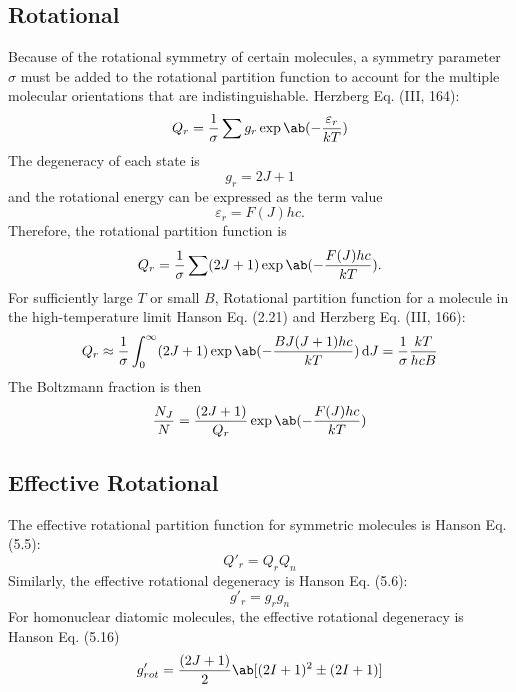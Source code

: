 \documentclass[11pt, twoside, fleqn]{report}
\begin{document}
\subsection{Rotational}
Because of the rotational symmetry of certain molecules, a symmetry parameter $\sigma$ must be added to the rotational partition function to account for the multiple molecular orientations that are indistinguishable.
Herzberg Eq. (III, 164):
\begin{equation*}
    Q_{r} = \frac{1}{\sigma} \sum g_{r}\exp\ab(-\frac{\varepsilon_{r}}{kT})
\end{equation*}
The degeneracy of each state is
\begin{equation*}
    g_{r} = 2J + 1
\end{equation*}
and the rotational energy can be expressed as the term value
\begin{equation*}
    \varepsilon_{r} = F(J)hc.
\end{equation*}
Therefore, the rotational partition function is
\begin{equation*}
    Q_{r} = \frac{1}{\sigma} \sum (2J + 1)\exp\ab(-\frac{F(J)hc}{kT}).
\end{equation*}
For sufficiently large $T$ or small $B$,
Rotational partition function for a molecule in the high-temperature limit Hanson Eq. (2.21) and Herzberg Eq. (III, 166):
\begin{equation*}
    Q_{r} \approx \frac{1}{\sigma} \int_{0}^{\infty} (2J + 1)\exp\ab(-\frac{BJ(J + 1)hc}{kT}) \odif{J} = \frac{1}{\sigma}\frac{kT}{hcB}
\end{equation*}
The Boltzmann fraction is then
\begin{equation*}
    \frac{N_{J}}{N} = \frac{(2J + 1)}{Q_{r}}\exp\ab(-\frac{F(J)hc}{kT})
\end{equation*}

\subsection{Effective Rotational}

The effective rotational partition function for symmetric molecules is Hanson Eq. (5.5):
\begin{equation*}
    Q'_{r} = Q_{r}Q_{n}
\end{equation*}
Similarly, the effective rotational degeneracy is Hanson Eq. (5.6):
\begin{equation*}
    g'_{r} = g_{r}g_{n}
\end{equation*}
For homonuclear diatomic molecules, the effective rotational degeneracy is Hanson Eq. (5.16)
\begin{equation*}
    g'_{rot} = \frac{(2J + 1)}{2}\ab[(2I + 1)^{2} \pm (2I + 1)]
\end{equation*}
\end{document}
